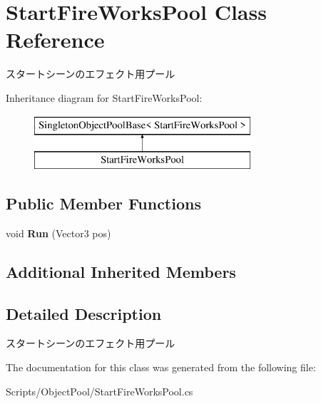 \hypertarget{class_start_fire_works_pool}{}\section{Start\+Fire\+Works\+Pool Class Reference}
\label{class_start_fire_works_pool}


スタートシーンのエフェクト用プール  


Inheritance diagram for Start\+Fire\+Works\+Pool\+:\begin{figure}[H]
\begin{center}
\leavevmode
\includegraphics[height=2.000000cm]{class_start_fire_works_pool}
\end{center}
\end{figure}
\subsection*{Public Member Functions}
\begin{DoxyCompactItemize}
\item 
void {\bfseries Run} (Vector3 pos)\hypertarget{class_start_fire_works_pool_a9038d1cc7630e0508d3d8dee7179e1a4}{}\label{class_start_fire_works_pool_a9038d1cc7630e0508d3d8dee7179e1a4}

\end{DoxyCompactItemize}
\subsection*{Additional Inherited Members}


\subsection{Detailed Description}
スタートシーンのエフェクト用プール 



The documentation for this class was generated from the following file\+:\begin{DoxyCompactItemize}
\item 
Scripts/\+Object\+Pool/Start\+Fire\+Works\+Pool.\+cs\end{DoxyCompactItemize}
